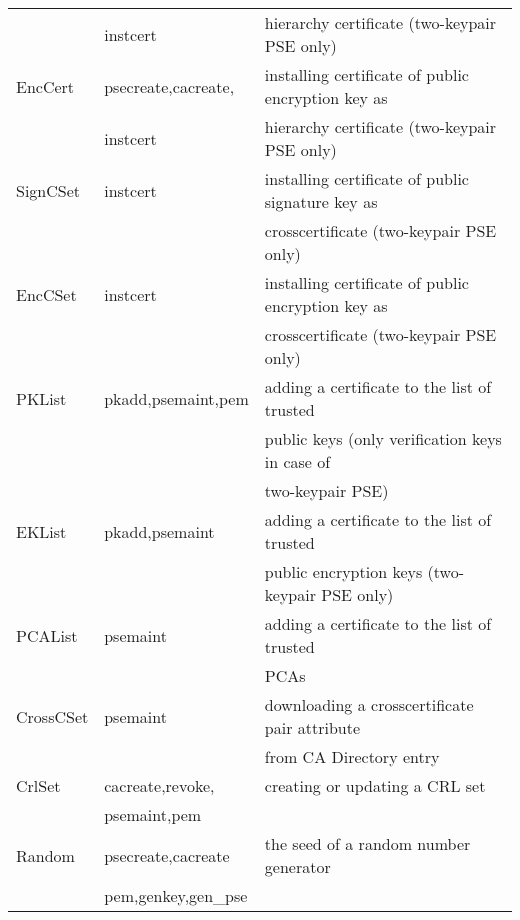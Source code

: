 {\begin{tabular}{|l|l|l|}
             & instcert            & hierarchy certificate (two-keypair PSE only)        \\
EncCert      & psecreate,cacreate, & installing certificate of public encryption key as  \\
             & instcert            & hierarchy certificate (two-keypair PSE only)        \\
SignCSet     & instcert            & installing certificate of public signature key as   \\
             &                     & crosscertificate (two-keypair PSE only)             \\
EncCSet      & instcert            & installing certificate of public encryption key as  \\
             &                     & crosscertificate (two-keypair PSE only)             \\
PKList       & pkadd,psemaint,pem  & adding a certificate to the list of trusted         \\
             &                     & public keys (only verification keys in case of      \\
             &                     &  two-keypair PSE)                                   \\
EKList       & pkadd,psemaint      & adding a certificate to the list of trusted         \\
             &                     & public encryption keys (two-keypair PSE only)       \\
PCAList      & psemaint            & adding a certificate to the list of trusted         \\
             &                     & PCAs                                                \\
CrossCSet    & psemaint            & downloading a crosscertificate pair attribute       \\
             &                     & from CA Directory entry                             \\
CrlSet       & cacreate,revoke,    & creating or updating a CRL set                      \\
             & psemaint,pem        &                                                     \\
Random       & psecreate,cacreate  & the seed of a random number generator               \\
             & pem,genkey,gen\_pse &                                                     \\

\end{tabular}}
